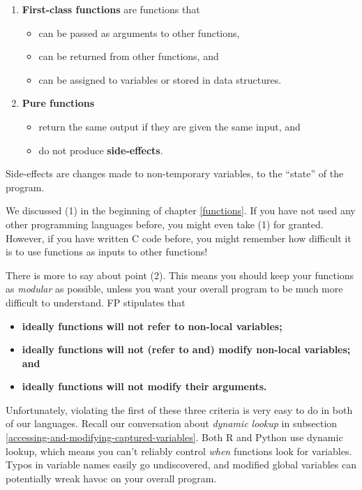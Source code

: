\documentclass[
  12pt,
  krantz2]{krantz}
\providecommand{\tightlist}{%
  \setlength{\itemsep}{0pt}\setlength{\parskip}{0pt}}
\begin{document}
\begin{enumerate}
\def\labelenumi{\arabic{enumi}.}
\tightlist
\item
  \textbf{First-class functions} are \citep{struc_and_interp} functions that

  \begin{itemize}
  \tightlist
  \item
    can be passed as arguments to other functions,
  \item
    can be returned from other functions, and
  \item
    can be assigned to variables or stored in data structures.
  \end{itemize}
\item
  \textbf{Pure functions}

  \begin{itemize}
  \tightlist
  \item
    return the same output if they are given the same input, and
  \item
    do not produce \textbf{side-effects}.
  \end{itemize}
\end{enumerate}

Side-effects are changes made to non-temporary variables, to the ``state'' of the program.

We discussed (1) in the beginning of chapter \ref{functions}. If you have not used any other programming languages before, you might even take (1) for granted. However, if you have written C code before, you might remember how difficult it is to use functions as inputs to other functions!

There is more to say about point (2). This means you should keep your functions as \emph{modular} as possible, unless you want your overall program to be much more difficult to understand. FP stipulates that

\begin{itemize}
\item
  \textbf{ideally functions will not refer to non-local variables;}
\item
  \textbf{ideally functions will not (refer to and) modify non-local variables; and}
\item
  \textbf{ideally functions will not modify their arguments.}
\end{itemize}

Unfortunately, violating the first of these three criteria is very easy to do in both of our languages. Recall our conversation about \emph{dynamic lookup} in subsection \ref{accessing-and-modifying-captured-variables}. Both R and Python use dynamic lookup, which means you can't reliably control \emph{when} functions look for variables. Typos in variable names easily go undiscovered, and modified global variables can potentially wreak havoc on your overall program.
\end{document}
